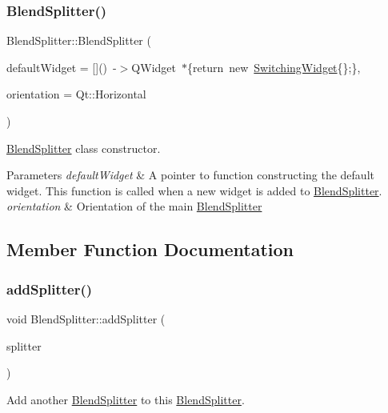 \subsubsection{\texorpdfstring{Blend\+Splitter()}{BlendSplitter()}}
{\footnotesize\ttfamily Blend\+Splitter\+::\+Blend\+Splitter (\begin{DoxyParamCaption}\item[{Q\+Widget $\ast$($\ast$)()}]{default\+Widget = {\ttfamily \mbox{[}\mbox{]}()~-\/$>$QWidget~$\ast$\{return~new~\hyperlink{class_switching_widget}{Switching\+Widget}\{\};\}},  }\item[{Qt\+::\+Orientation}]{orientation = {\ttfamily Qt\+:\+:Horizontal} }\end{DoxyParamCaption})}



\hyperlink{class_blend_splitter}{Blend\+Splitter} class constructor. 


\begin{DoxyParams}{Parameters}
{\em default\+Widget} & A pointer to function constructing the default widget. This function is called when a new widget is added to \hyperlink{class_blend_splitter}{Blend\+Splitter}. \\
\hline
{\em orientation} & Orientation of the main \hyperlink{class_blend_splitter}{Blend\+Splitter} \\
\hline
\end{DoxyParams}


\subsection{Member Function Documentation}
\hypertarget{class_blend_splitter_abcee5dda4bde4fdb6fda1f3c1f5b9c9a}{}\label{class_blend_splitter_abcee5dda4bde4fdb6fda1f3c1f5b9c9a} 
\subsubsection{\texorpdfstring{add\+Splitter()}{addSplitter()}}
{\footnotesize\ttfamily void Blend\+Splitter\+::add\+Splitter (\begin{DoxyParamCaption}\item[{\hyperlink{class_blend_splitter}{Blend\+Splitter} $\ast$}]{splitter }\end{DoxyParamCaption})}



Add another \hyperlink{class_blend_splitter}{Blend\+Splitter} to this \hyperlink{class_blend_splitter}{Blend\+Splitter}. 

